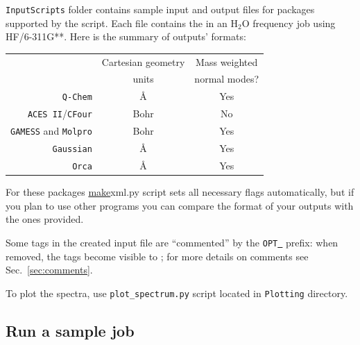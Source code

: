\documentclass[11pt]{article}
\begin{document}
{\tt InputScripts} folder contains sample input and output files
for \ai packages supported by the script.
Each file contains the in an H$_2$O frequency job using HF/6-311G**.
Here is the summary of \ai outputs' formats:

\begin{center}
\begin{tabular}{rcc}
\hline
  & Cartesian geometry & Mass weighted\\
  & units              & normal modes? \\
\hline
{\tt Q-Chem} & \AA & Yes\\
{\tt ACES II}/{\tt CFour}  & Bohr & No\\
{\tt GAMESS} and {\tt Molpro}  & Bohr & Yes\\
{\tt Gaussian}  & \AA & Yes\\
{\tt Orca}      & \AA  & Yes   \\
\hline
\end{tabular}
\end{center}

For these packages \ul{make}{xml.py} script sets all necessary flags automatically,
but if you plan to use other \ai programs you can compare the format of your
outputs with the ones provided.

Some tags in the created input \xml file are ``commented'' by
the {\tt OPT\underline{~}} prefix: when removed, the tags become
visible to \ezFCF; for more details on comments see Sec.~\ref{sec:comments}.

To plot the spectra, use {\tt plot\_spectrum.py} script located in {\tt Plotting} directory.  

\subsection{Run a sample job}
\end{document}

